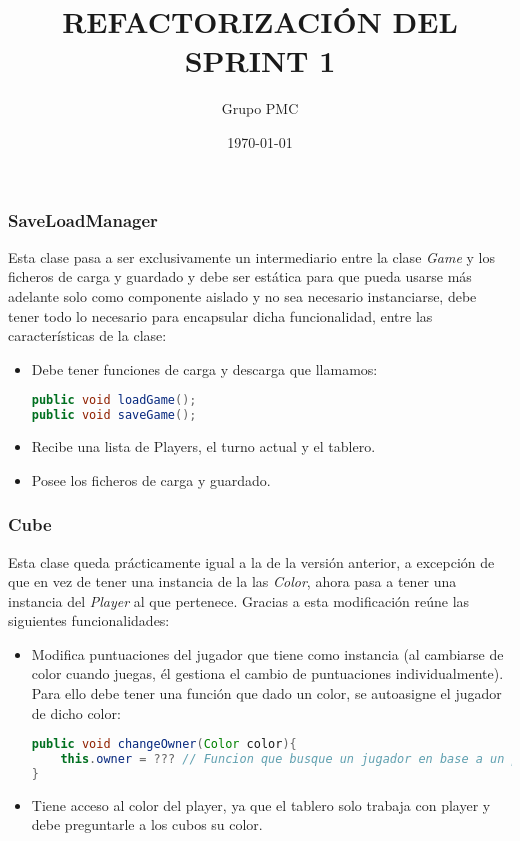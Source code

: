 \documentclass{article}
\title{REFACTORIZACIÓN DEL SPRINT 1}
\date{\today}
\author{Grupo PMC}
\begin{document}
\maketitle

\subsubsection*{SaveLoadManager}
Esta clase pasa a ser exclusivamente un intermediario entre la clase \textit{Game} y los ficheros de carga y guardado y debe ser estática para que pueda usarse más adelante solo como componente aislado y no sea necesario instanciarse, debe tener todo lo necesario para encapsular dicha funcionalidad, entre las características de la clase:
\begin{itemize}
\item Debe tener funciones de carga y descarga que llamamos:
\begin{lstlisting}[language=Java]
public void loadGame();
public void saveGame();
\end{lstlisting}
\item Recibe una lista de Players, el turno actual y el tablero.
\item Posee los ficheros de carga y guardado.
\end{itemize}

\subsubsection*{Cube}
Esta clase queda prácticamente igual a la de la versión anterior, a excepción de que en vez de tener una instancia de la las \textit{Color}, ahora pasa a tener una instancia del \textit{Player} al que pertenece.
Gracias a esta modificación reúne las siguientes funcionalidades:
\begin{itemize}
\item Modifica puntuaciones del jugador que tiene como instancia (al cambiarse de color cuando juegas, él gestiona el cambio de puntuaciones individualmente). Para ello debe tener una función que dado un color, se autoasigne el jugador de dicho color:
\begin{lstlisting}[language=Java]
public void changeOwner(Color color){
	this.owner = ??? // Funcion que busque un jugador en base a un player
}

\end{lstlisting}
\item Tiene acceso al color del player, ya que el tablero solo trabaja con player y debe preguntarle a los cubos su color.
\end{itemize}
\end{document}
